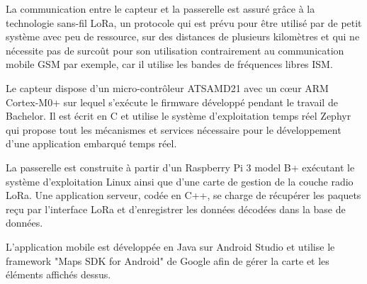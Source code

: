 \begin{normalsize}
La communication entre le capteur et la passerelle est assuré grâce à la technologie sans-fil LoRa, un protocole qui est prévu pour être utilisé par de petit système avec peu de ressource, sur des distances de plusieurs kilomètres et qui ne nécessite pas de surcoût pour son utilisation contrairement au communication mobile GSM par exemple, car il utilise les bandes de fréquences libres ISM.

Le capteur dispose d'un micro-contrôleur ATSAMD21 avec un cœur ARM Cortex-M0+ sur lequel s'exécute le firmware développé pendant le travail de Bachelor. Il est écrit en C et utilise le système d'exploitation temps réel Zephyr qui propose tout les mécanismes et services nécessaire pour le développement d'une application embarqué temps réel.

La passerelle est construite à partir d'un Raspberry Pi 3 model B+ exécutant le système d'exploitation Linux ainsi que d'une carte de gestion de la couche radio LoRa. Une application serveur, codée en C++, se charge de récupérer les paquets reçu par l'interface LoRa et d'enregistrer les données décodées dans la base de données.

L'application mobile est développée en Java sur Android Studio et utilise le framework "Maps SDK for Android" de Google afin de gérer la carte et les éléments affichés dessus.

\end{normalsize}

